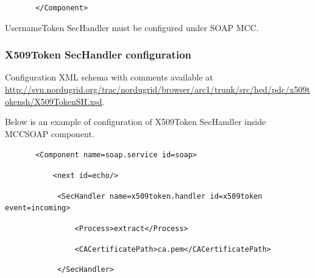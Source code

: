 \documentclass{article}
\newcommand\textstyleInternetlink[1]{\textcolor[rgb]{0.0,0.0,0.5019608}{#1}}
\begin{document}
{\upshape\color{black}
\texttt{\ \ \ \ \ \ \ {\textless}/Component{\textgreater}}}

{\color{black}
UsernameToken SecHandler must be configured under SOAP MCC.}

\subsubsection[X509Token SecHandler configuration]{X509Token SecHandler
configuration}
{\upshape\color{black}
Configuration XML schema with comments available at
\href{http://svn.nordugrid.org/trac/nordugrid/browser/arc1/trunk/src/hed/pdc/usernametokensh/UsernameTokenSH.xsd}{\textstyleInternetlink{http://svn.nordugrid.org/trac/nordugrid/browser/arc1/trunk/src/hed/pdc/x509tokensh/X509TokenSH.xsd}}.}

{\upshape\color{black}
Below is an example of configuration of X509Token SecHandler inside
MCCSOAP component.}

{\upshape\color{black}
\texttt{\ \ \ \ \ \ \ {\textless}Component
name={\textquotedbl}soap.service{\textquotedbl}
id={\textquotedbl}soap{\textquotedbl}{\textgreater}}}

{\upshape\color{black}
\texttt{\ \ \ \ \ \ \ \ \ \ \ {\textless}next
id={\textquotedbl}echo{\textquotedbl}/{\textgreater}}}

{\upshape\color{black}
\texttt{\ \ \ \ \ \ \ \ \ \ \ \ {\textless}SecHandler
name={\textquotedbl}x509token.handler{\textquotedbl}
id={\textquotedbl}x509token{\textquotedbl}
event={\textquotedbl}incoming{\textquotedbl}{\textgreater}}}


\bigskip

{\upshape\color{black}
\texttt{\ \ \ \ \ \ \ \ \ \ \ \ \ \ \ \ {\textless}Process{\textgreater}extract{\textless}/Process{\textgreater}}}


\bigskip

{\upshape\color{black}
\texttt{\ \ \ \ \ \ \ \ \ \ \ \ \ \ \ \ {\textless}CACertificatePath{\textgreater}ca.pem{\textless}/CACertificatePath{\textgreater}}}


\bigskip

{\upshape\color{black}
\texttt{\ \ \ \ \ \ \ \ \ \ \ \ {\textless}/SecHandler{\textgreater}}}


\bigskip
\end{document}

